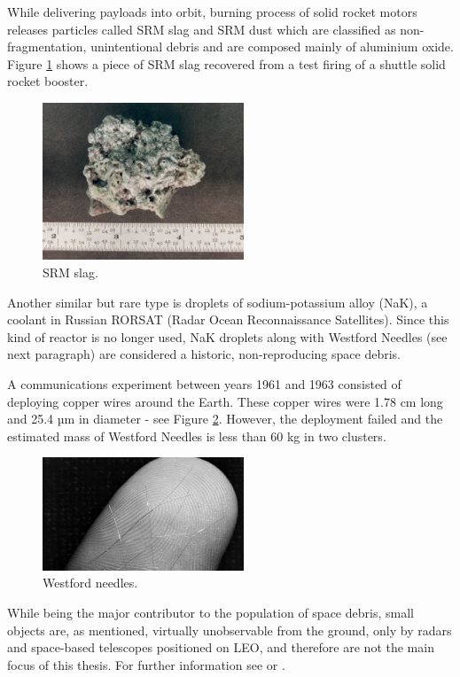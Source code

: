 	While delivering payloads into orbit, burning process of solid rocket motors releases particles called SRM slag and SRM dust which are classified as non-fragmentation, unintentional debris and are composed mainly of aluminium oxide. Figure \ref{fig:srmslag} shows a piece of SRM slag recovered from a test firing of a shuttle solid rocket booster.
	
\begin{figure}[H]
\centering
  \includegraphics[width=6cm]{images/slag}
  \caption{SRM slag.}
  \label{fig:srmslag}
\end{figure}	
	
	Another similar but rare type is droplets of sodium-potassium alloy (NaK), a coolant in Russian RORSAT (Radar Ocean Reconnaissance Satellites). Since this kind of reactor is no longer used, NaK droplets along with Westford Needles (see next paragraph) are considered a historic, non-reproducing space debris. 
	
	A communications experiment between years 1961 and 1963 consisted of deploying copper wires around the Earth. These copper wires were 1.78 cm long and 25.4 µm in diameter - see Figure \ref{fig:westfordneedles}. However, the deployment failed and the estimated mass of Westford Needles is less than 60 kg in two clusters.
	
\begin{figure}[H]
\centering
  \includegraphics[width=6cm]{images/westfordneedles}
  \caption{Westford needles.}
  \label{fig:westfordneedles}
\end{figure}	
	
	While being the major contributor to the population of space debris, small objects are, as mentioned, virtually unobservable from the ground, only by radars and space-based telescopes positioned on LEO, and therefore are not the main focus of this thesis. For further information see \citep{klinkrad2006space} or \citep{Silha2012id}.

